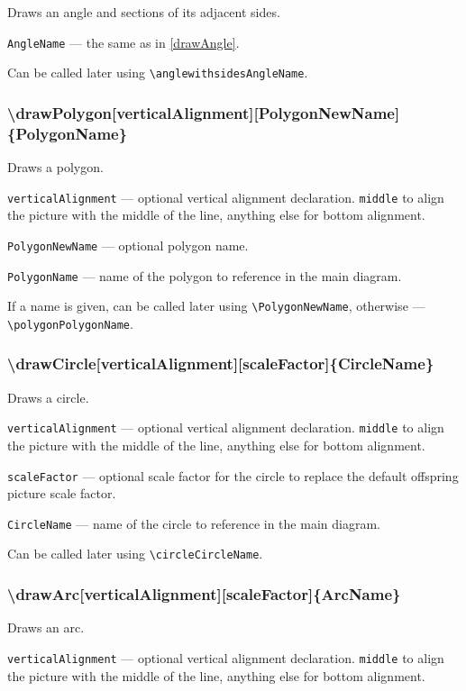 \documentclass{ltxdoc}
\begin{document}
	Draws an angle and sections of its adjacent sides.

	\texttt{AngleName} — the same as in \ref{drawAngle}.
	
	Can be called later using \texttt{\textbackslash anglewithsidesAngleName}.
	
\subsubsection{\textbackslash drawPolygon[verticalAlignment][PolygonNewName]\{PolygonName\}}

	Draws a polygon.

	\texttt{verticalAlignment} — optional vertical alignment declaration. \texttt{middle} to align the picture with the middle of the line, anything else for bottom alignment.

	\texttt{PolygonNewName} — optional polygon name. 
	
	\texttt{PolygonName} — name of the polygon to reference in the main diagram. 
	
	If a name is given, can be called later using \texttt{\textbackslash PolygonNewName}, otherwise — \texttt{\textbackslash polygonPolygonName}. 
	
\subsubsection{\textbackslash drawCircle[verticalAlignment][scaleFactor]\{CircleName\}}

	Draws a circle.

	\texttt{verticalAlignment} — optional vertical alignment declaration. \texttt{middle} to align the picture with the middle of the line, anything else for bottom alignment.
	
	\texttt{scaleFactor} — optional scale factor for the circle to replace the default offspring picture scale factor. 
	
	\texttt{CircleName} — name of the circle to reference in the main diagram. 
	
	Can be called later using \texttt{\textbackslash circleCircleName}.
	
\subsubsection{\textbackslash drawArc[verticalAlignment][scaleFactor]\{ArcName\}}

	Draws an arc.

	\texttt{verticalAlignment} — optional vertical alignment declaration. \texttt{middle} to align the picture with the middle of the line, anything else for bottom alignment.
	
\end{document}
